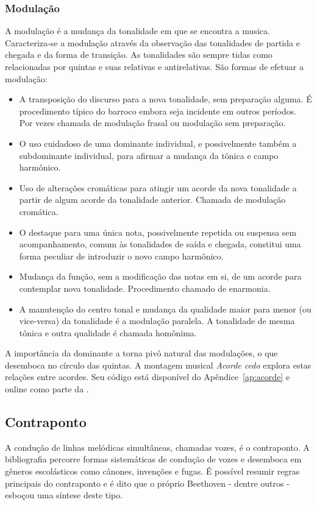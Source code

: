\subsubsection{Modulação}
A modulação é a mudança da tonalidade em que se encontra a musica. Caracteriza-se a modulação através da observação
das tonalidades de partida e chegada e da forma de transição. As tonalidades são sempre tidas como relacionadas por quintas e suas relativas e antirelativas. São formas de efetuar a modulação:
\begin{itemize}
    \item A transposição do discurso para a nova tonalidade, sem preparação alguma. É procedimento típico do barroco embora seja incidente em outros períodos. Por vezes chamada de modulação frasal ou modulação sem preparação.
    \item O uso cuidadoso de uma dominante individual, e possivelmente também a subdominante individual, para afirmar a mudança da tônica e campo harmônico.
    \item Uso de alterações cromáticas para atingir um acorde da nova tonalidade a partir de algum acorde da tonalidade anterior. Chamada de modulação cromática.
    \item O destaque para uma única nota, possivelmente repetida ou suspensa sem acompanhamento, comum às tonalidades de saída e chegada, constitui uma forma peculiar de introduzir o novo campo harmônico.
    \item Mudança da função, sem a modificação das notas em si, de um acorde para contemplar nova tonalidade. Procedimento chamado de enarmonia.
    \item A manutenção do centro tonal e mudança da qualidade maior para menor (ou vice-versa) da tonalidade é a modulação paralela. A tonalidade de mesma tônica e outra qualidade é chamada homônima.
\end{itemize}

A importância da dominante a torna pivô natural das modulações, o que desemboca no círculo das quintas.\cite{Harmonia,Salzer,Koellheuteur,Harmony} A montagem musical \emph{Acorde cedo} explora estas relações entre acordes. Seu código está disponível do Apêndice~\ref{ap:acorde} e online como parte da \massa.\cite{MASSA}


\subsection{Contraponto}\label{subsec:contraponto}

A condução de linhas melódicas simultâneas, chamadas vozes,
é o contraponto. A bibliografia
percorre formas sistemáticas de condução de vozes e desemboca em gêneros escolásticos como cânones, invenções e fugas. É possível resumir regras principais do contraponto e é dito que o próprio Beethoven - dentre outros - esboçou uma síntese deste tipo.

